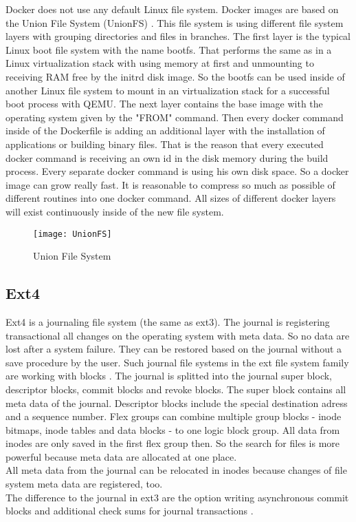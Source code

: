 Docker does not use any default Linux file system. 
Docker images are based on the Union File System (UnionFS) \cite[~p.21]{Ashraf2015}. 
This file system is using different file system layers with grouping directories and files in branches. 
The first layer is the typical Linux boot file system with the name bootfs. 
That performs the same as in a Linux virtualization stack with using memory at first and unmounting to receiving RAM free by the initrd disk image. 
So the bootfs can be used inside of another Linux file system to mount in an virtualization stack for a successful boot process with QEMU.
The next layer contains the base image with the operating system given by the "FROM" command.
Then every docker command inside of the Dockerfile is adding an additional layer with the installation of applications or building binary files.
That is the reason that every executed docker command is receiving an own id in the disk memory during the build process.
Every separate docker command is using his own disk space. So a docker image can grow really fast.
It is reasonable to compress so much as possible of different routines into one docker command. 
All sizes of different docker layers will exist continuously inside of the new file system.

\begin{figure}[H]
\centering
\texttt{[image: UnionFS]}
 \caption{Union File System}
    \label{UnionFS}
\end{figure}

\subsection{Ext4}

Ext4 is a journaling file system (the same as ext3). The journal is registering transactional all changes on the operating system with meta data.
So no data  are lost after a system failure. They can be restored based on the journal without a save procedure by the user.
Such journal file systems in the ext file system family are working with blocks \cite[~p.20]{Seufert2015}.
The journal is splitted into the journal super block, descriptor blocks, commit blocks and revoke blocks.
The super block contains all meta data of the journal. Descriptor blocks include the special destination adress and a sequence number. 
Flex groups can combine multiple group blocks - inode bitmaps, inode tables and data blocks - to one logic block group. All data from inodes are only saved in the first flex group then. 
So the search for files is more powerful because meta data are allocated at one place.\\
All meta data from the journal can be relocated in inodes because changes of file system meta data are registered, too. \\
The difference to the journal in ext3 are the option writing asynchronous commit blocks and additional check sums for journal transactions \cite[~p.28]{Seufert2015}.

